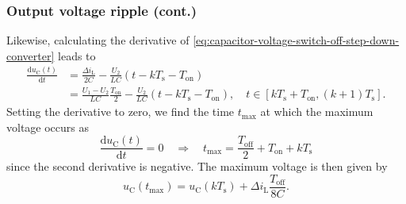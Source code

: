 \begin{frame}
    \frametitle{Output voltage ripple (cont.)}
    Likewise, calculating the derivative of \eqref{eq:capacitor-voltage-switch-off-step-down-converter} leads to
    \begin{equation}
        \begin{split}
            \frac{\mathrm{d}u_\mathrm{C}(t)}{\mathrm{d}t} &= \frac{\Delta i_\mathrm{L}}{2 C} - \frac{U_2}{LC} (t-kT_\mathrm{s} - T_\mathrm{on})\\
                                                          &= \frac{U_1-U_2}{LC}\frac{T_\mathrm{on}}{2} -\frac{U_2}{LC} (t-kT_\mathrm{s} - T_\mathrm{on}), \quad t\in [k T_\mathrm{s} + T_\mathrm{on}, (k+1) T_\mathrm{s}].
        \end{split}
    \end{equation}
    Setting the derivative to zero, we find the time $t_\mathrm{max}$ at which the maximum voltage occurs as
    \begin{equation}
        \frac{\mathrm{d}u_\mathrm{C}(t)}{\mathrm{d}t} = 0 \quad \Rightarrow \quad t_\mathrm{max} = \frac{T_\mathrm{off}}{2} + T_\mathrm{on} + k T_\mathrm{s}
    \end{equation}
    since the second derivative is negative. The maximum voltage is then given by
    \begin{equation}
        u_\mathrm{C}(t_\mathrm{max}) = u_\mathrm{C}(kT_\mathrm{s}) + \Delta i_\mathrm{L}\frac{T_\mathrm{off}}{8C}.
    \end{equation}
\end{frame}

